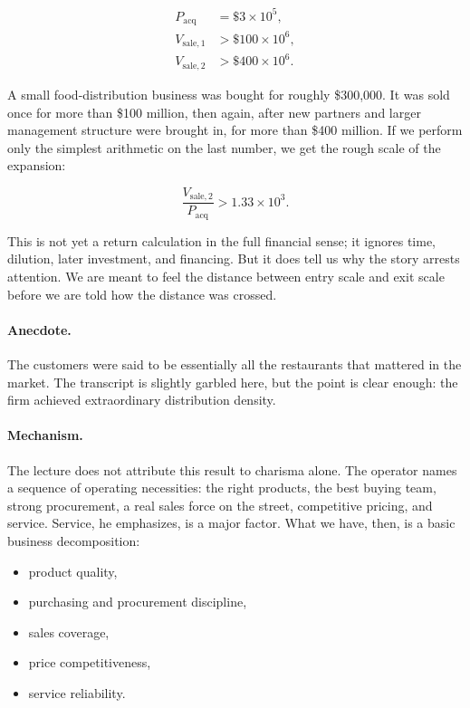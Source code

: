 \begin{align}
P_{\text{acq}} &= \$3 \times 10^5,\\
V_{\text{sale},1} &> \$100 \times 10^6,\\
V_{\text{sale},2} &> \$400 \times 10^6.
\end{align}

A small food-distribution business was bought for roughly \$300{,}000. It was sold once for more than \$100 million, then again, after new partners and larger management structure were brought in, for more than \$400 million. If we perform only the simplest arithmetic on the last number, we get the rough scale of the expansion:

\begin{equation}
\frac{V_{\text{sale},2}}{P_{\text{acq}}} > 1.33 \times 10^3.
\end{equation}

This is not yet a return calculation in the full financial sense; it ignores time, dilution, later investment, and financing. But it does tell us why the story arrests attention. We are meant to feel the distance between entry scale and exit scale before we are told how the distance was crossed.

\paragraph{Anecdote.}
The customers were said to be essentially all the restaurants that mattered in the market. The transcript is slightly garbled here, but the point is clear enough: the firm achieved extraordinary distribution density.

\paragraph{Mechanism.}
The lecture does not attribute this result to charisma alone. The operator names a sequence of operating necessities: the right products, the best buying team, strong procurement, a real sales force on the street, competitive pricing, and service. Service, he emphasizes, is a major factor. What we have, then, is a basic business decomposition:
\begin{itemize}
\item product quality,
\item purchasing and procurement discipline,
\item sales coverage,
\item price competitiveness,
\item service reliability.
\end{itemize}

